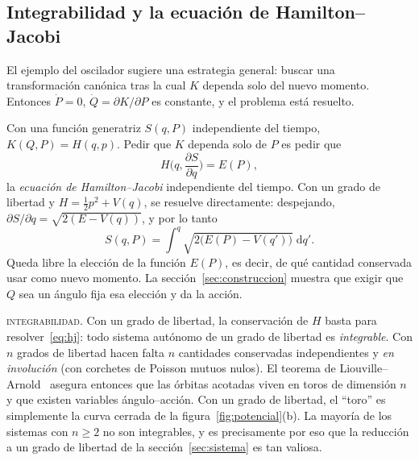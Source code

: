 \documentclass[11pt,a4paper]{article}
\newcommand{\dd}{\mathrm{d}}
\theoremstyle{definition}
\begin{document}
\subsection{Integrabilidad y la ecuación de Hamilton--Jacobi}
\label{sec:hj}

El ejemplo del oscilador sugiere una estrategia general: buscar una transformación
canónica tras la cual $K$ dependa solo del nuevo momento. Entonces $\dot P=0$,
$\dot Q=\partial K/\partial P$ es constante, y el problema está resuelto.

Con una función generatriz $S(q,P)$ independiente del tiempo, $K(Q,P)=H(q,p)$. Pedir
que $K$ dependa solo de $P$ es pedir que
\begin{equation}
  H\!\Big(q,\frac{\partial S}{\partial q}\Big) = E(P) ,
  \label{eq:hj}
\end{equation}
la \emph{ecuación de Hamilton--Jacobi} independiente del tiempo. Con un grado de
libertad y $H=\tfrac12p^2+V(q)$, se resuelve directamente: despejando,
$\partial S/\partial q=\sqrt{2(E-V(q))}$, y por lo tanto
\begin{equation}
  S(q,P) = \int^{q}\sqrt{2\big(E(P)-V(q')\big)}\;\dd q' .
\end{equation}
Queda libre la elección de la función $E(P)$, es decir, de qué cantidad conservada
usar como nuevo momento. La sección~\ref{sec:construccion} muestra que exigir que
$Q$ sea un ángulo fija esa elección y da la acción.

\begin{aviso}
\textsc{integrabilidad.} Con un grado de libertad, la conservación de $H$ basta para
resolver~\eqref{eq:hj}: todo sistema autónomo de un grado de libertad es
\emph{integrable}. Con $n$ grados de libertad hacen falta $n$ cantidades conservadas
independientes y \emph{en involución} (con corchetes de Poisson mutuos nulos). El
teorema de Liouville--Arnold~\cite[\S49]{arnold1989} asegura entonces que las órbitas
acotadas viven en toros de dimensión $n$ y que existen variables ángulo--acción. Con
un grado de libertad, el ``toro'' es simplemente la curva cerrada de la
figura~\ref{fig:potencial}(b). La mayoría de los sistemas con $n\ge2$ no son
integrables, y es precisamente por eso que la reducción a un grado de libertad de la
sección~\ref{sec:sistema} es tan valiosa.
\end{aviso}
\end{document}
